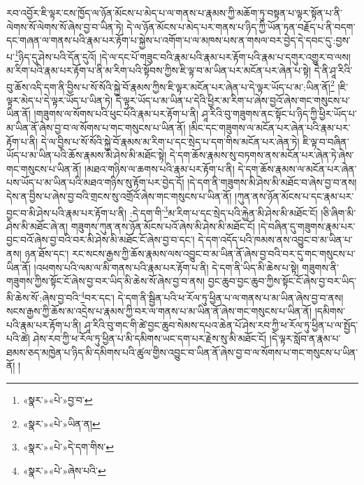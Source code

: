 རབ་འབྱོར་ཇི་ལྟར་ངས་ཁྱོད་ལ་ཉོན་མོངས་པ་མེད་པ་ལ་གནས་པ་རྣམས་ཀྱི་མཆོག་ཏུ་བསྟན་པ་ལྟར་སྟོན་པ་ནི་ལེགས་སོ་ལེགས་སོ་ཞེས་བྱ་བ་ཡིན་ཏེ། དེ་ལ་ཉོན་མོངས་པ་མེད་པར་གནས་པ་ཉིད་ཀྱི་ཡོན་ཏན་བརྗོད་པ་ནི་བདག་དང་གཞན་ལ་གནས་པའི་རྣམ་པར་རྟོག་པ་སྐྱེས་པ་འགོག་པ་ལ་མཁས་པས་ན་གསལ་བར་བྱེད་དེ་དབང་དུ་:བྱས་པ་\footnote{«སྣར་»«པེ་»བྱ་བ་}ཉིད་དུ་ཤེས་པའི་དོན་དུའོ། །དེ་ལ་དང་པོ་གཟུང་བའི་རྣམ་པའི་རྣམ་པར་རྟོག་པའི་རྣམ་པ་དགུར་འགྱུར་བ་ལས། མ་རིག་པའི་རྣམ་པར་རྟོག་པ་ནི་མ་རིག་པའི་སྟོབས་ཀྱིས་ཇི་ལྟ་བ་མ་ཡིན་པར་མངོན་པར་ཞེན་པ་སྟེ། དེ་ནི་ཤཱ་རིའི་བུ་ཆོས་འདི་དག་ནི་བྱིས་པ་སོ་སོའི་སྐྱེ་བོ་རྣམས་ཀྱིས་ཇི་ལྟར་མངོན་པར་ཞེན་པ་དེ་ལྟར་ཡོད་པ་མ་:ཡིན་ནོ།\footnote{«སྣར་»«པེ་»ཡིན་ན།} །ཇི་ལྟར་མེད་པ་དེ་ལྟར་ཡོད་པ་ཡིན་ཏེ། དེ་ལྟར་ཡོད་པ་མ་ཡིན་པ་དེའི་ཕྱིར་མ་རིག་པ་ཞེས་བྱའོ་ཞེས་གང་གསུངས་པ་ཡིན་ནོ། །གཟུགས་ལ་སོགས་པའི་ཕུང་པོའི་རྣམ་པར་རྟོག་པ་ནི། ཤཱ་རིའི་བུ་གཟུགས་ནང་སྟོང་པ་ཉིད་ཀྱི་ཕྱིར་ཡོད་པ་མ་ཡིན་ནོ་ཞེས་བྱ་བ་ལ་སོགས་པ་གང་གསུངས་པ་ཡིན་ནོ། །མིང་དང་གཟུགས་ལ་མངོན་པར་ཞེན་པའི་རྣམ་པར་རྟོག་པ་ནི། དེ་ལ་བྱིས་པ་སོ་སོའི་སྐྱེ་བོ་རྣམས་མ་རིག་པ་དང་སྲེད་པ་དག་གིས་མངོན་པར་ཞེན་ཏེ། ཇི་ལྟ་བ་བཞིན་ཡོད་པ་མ་ཡིན་པའི་ཆོས་རྣམས་མི་ཤེས་མི་མཐོང་སྟེ། དེ་དག་ཆོས་རྣམས་སུ་བཏགས་ནས་མངོན་པར་ཞེན་ཏེ་ཞེས་གང་གསུངས་པ་ཡིན་ནོ། །མཐའ་གཉིས་ལ་ཆགས་པའི་རྣམ་པར་རྟོག་པ་ནི། དེ་དག་ཆོས་རྣམས་ལ་མངོན་པར་ཞེན་པས་ཡོད་པ་མ་ཡིན་པའི་མཐའ་གཉིས་སུ་རྟོག་པར་བྱེད་དོ། །དེ་དག་ནི་གཟུགས་མི་ཤེས་མི་མཐོང་བ་ཞེས་བྱ་བ་ནས། དེས་ན་བྱིས་པ་ཞེས་བྱ་བའི་གྲངས་སུ་འགྲོའོ་ཞེས་གང་གསུངས་པ་ཡིན་ནོ། །ཀུན་ནས་ཉོན་མོངས་པ་དང་རྣམ་པར་བྱང་བ་མི་ཤེས་པའི་རྣམ་པར་རྟོག་པ་ནི། :དེ་དག་གི་\footnote{«སྣར་»«པེ་»དེ་དག་གིས་}མ་རིག་པ་དང་སྲེད་པའི་རྐྱེན་མི་ཤེས་མི་མཐོང་ངོ། །ཅི་ཞིག་མི་ཤེས་མི་མཐོང་ཞེ་ན། གཟུགས་ཀུན་ནས་ཉོན་མོངས་པའོ་ཞེས་མི་ཤེས་མི་མཐོང་ངོ། །དེ་བཞིན་དུ་གཟུགས་རྣམ་པར་བྱང་བའོ་ཞེས་བྱ་བའི་བར་མི་ཤེས་མི་མཐོང་ངོ་ཞེས་བྱ་བ་དང་། དེ་དག་འདོད་པའི་ཁམས་ནས་འབྱུང་བ་མ་ཡིན་པ་ནས། ཉན་ཐོས་དང་། རང་སངས་རྒྱས་ཀྱི་ཆོས་རྣམས་ལས་འབྱུང་བ་མ་ཡིན་ནོ་ཞེས་བྱ་བའི་བར་དུ་གང་གསུངས་པ་ཡིན་ནོ། །འཕགས་པའི་ལམ་ལ་མི་གནས་པའི་རྣམ་པར་རྟོག་པ་ནི། དེ་དག་ནི་ཡིད་མི་ཆེས་པ་སྟེ། གཟུགས་ནི་གཟུགས་ཀྱིས་སྟོང་ངོ་ཞེས་བྱ་བར་ཡིད་མི་ཆེས་སོ་ཞེས་བྱ་བ་ནས། བྱང་ཆུབ་བྱང་ཆུབ་ཀྱིས་སྟོང་ངོ་ཞེས་བྱ་བར་ཡིད་མི་ཆེས་སོ་:ཞེས་བྱ་བའི་\footnote{«སྣར་»«པེ་»ཞེས་པའི་}བར་དང་། དེ་དག་ནི་སྦྱིན་པའི་ཕ་རོལ་ཏུ་ཕྱིན་པ་ལ་གནས་པ་མ་ཡིན་ཞེས་བྱ་བ་ནས། སངས་རྒྱས་ཀྱི་ཆོས་མ་འདྲེས་པ་རྣམས་ཀྱི་བར་ལ་གནས་པ་མ་ཡིན་ནོ་ཞེས་གང་གསུངས་པ་ཡིན་ནོ། །དམིགས་པའི་རྣམ་པར་རྟོག་པ་ནི། ཤཱ་རིའི་བུ་གང་གི་ཚེ་བྱང་ཆུབ་སེམས་དཔའ་ཆེན་པོ་ཤེས་རབ་ཀྱི་ཕ་རོལ་ཏུ་ཕྱིན་པ་ལ་སྤྱོད་པའི་ཚེ། ཤེས་རབ་ཀྱི་ཕ་རོལ་ཏུ་ཕྱིན་པ་མི་དམིགས་ཡང་དག་པར་རྗེས་སུ་མི་མཐོང་ངོ། །དེ་ལྟར་སློབ་ན་རྣམ་པ་ཐམས་ཅད་མཁྱེན་པ་ཉིད་མི་དམིགས་པའི་ཚུལ་གྱིས་འབྱུང་བ་ཡིན་ནོ་ཞེས་བྱ་བ་ལ་སོགས་པ་གང་གསུངས་པ་ཡིན་ནོ། །
